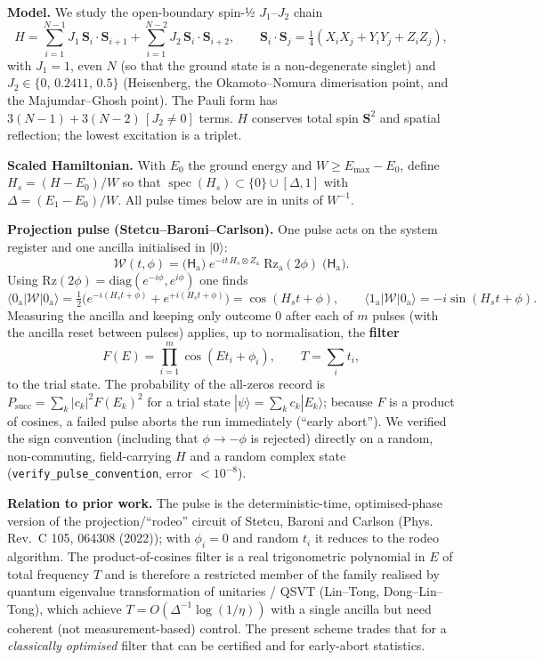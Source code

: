 \documentclass[
]{article}
\begin{document}
\textbf{Model.} We study the open-boundary spin-½ \(J_1\)--\(J_2\) chain
\[
H=\sum_{i=1}^{N-1}J_1\,\mathbf S_i\!\cdot\!\mathbf S_{i+1}+\sum_{i=1}^{N-2}J_2\,\mathbf S_i\!\cdot\!\mathbf S_{i+2},
\qquad \mathbf S_i\!\cdot\!\mathbf S_j=\tfrac14\left(X_iX_j+Y_iY_j+Z_iZ_j\right),
\] with \(J_1=1\), even \(N\) (so that the ground state is a
non-degenerate singlet) and \(J_2\in\{0,\,0.2411,\,0.5\}\) (Heisenberg,
the Okamoto--Nomura dimerisation point, and the Majumdar--Ghosh point).
The Pauli form has \(3(N-1)+3(N-2)\,[J_2\neq0]\) terms. \(H\) conserves
total spin \(\mathbf S^2\) and spatial reflection; the lowest excitation
is a triplet.

\textbf{Scaled Hamiltonian.} With \(E_0\) the ground energy and
\(W\ge E_{\max}-E_0\), define \(H_s=(H-E_0)/W\) so that
\(\operatorname{spec}(H_s)\subset\{0\}\cup[\Delta,1]\) with
\(\Delta=(E_1-E_0)/W\). All pulse times below are in units of
\(W^{-1}\).

\textbf{Projection pulse (Stetcu--Baroni--Carlson).} One pulse acts on
the system register and one ancilla initialised in \(|0\rangle\): \[
\mathcal W(t,\phi)=\big(\mathsf H_{\mathrm{a}}\big)\;e^{-it\,H_s\otimes Z_{\mathrm{a}}}\;\mathrm{Rz}_{\mathrm{a}}(2\phi)\;\big(\mathsf H_{\mathrm{a}}\big).
\] Using \(\mathrm{Rz}(2\phi)=\mathrm{diag}(e^{-i\phi},e^{i\phi})\) one
finds \[
\langle 0_{\mathrm{a}}|\mathcal W|0_{\mathrm{a}}\rangle=\tfrac12\big(e^{-i(H_st+\phi)}+e^{+i(H_st+\phi)}\big)=\cos(H_st+\phi),
\qquad
\langle 1_{\mathrm{a}}|\mathcal W|0_{\mathrm{a}}\rangle=-i\sin(H_st+\phi).
\] Measuring the ancilla and keeping only outcome \(0\) after each of
\(m\) pulses (with the ancilla reset between pulses) applies, up to
normalisation, the \textbf{filter} \[
F(E)=\prod_{i=1}^{m}\cos(Et_i+\phi_i),\qquad T=\sum_i t_i ,
\] to the trial state. The probability of the all-zeros record is
\(P_{\mathrm{succ}}=\sum_k|c_k|^2F(E_k)^2\) for a trial state
\(|\psi\rangle=\sum_kc_k|E_k\rangle\); because \(F\) is a product of
cosines, a failed pulse aborts the run immediately (``early abort''). We
verified the sign convention (including that \(\phi\to-\phi\) is
rejected) directly on a random, non-commuting, field-carrying \(H\) and
a random complex state (\texttt{verify\_pulse\_convention}, error
\(<10^{-8}\)).

\textbf{Relation to prior work.} The pulse is the deterministic-time,
optimised-phase version of the projection/``rodeo'' circuit of Stetcu,
Baroni and Carlson (Phys. Rev.~C 105, 064308 (2022)); with \(\phi_i=0\)
and random \(t_i\) it reduces to the rodeo algorithm. The
product-of-cosines filter is a real trigonometric polynomial in \(E\) of
total frequency \(T\) and is therefore a restricted member of the family
realised by quantum eigenvalue transformation of unitaries / QSVT
(Lin--Tong, Dong--Lin--Tong), which achieve
\(T=O(\Delta^{-1}\log(1/\eta))\) with a single ancilla but need coherent
(not measurement-based) control. The present scheme trades that for a
\emph{classically optimised} filter that can be certified and for
early-abort statistics.
\end{document}
